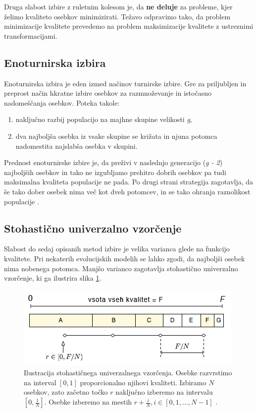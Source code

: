 \documentclass[a4paper, 12pt]{book}
\begin{document}
Druga slabost izbire z ruletnim kolesom je, da \textbf{ne deluje} za probleme, kjer \v zelimo kvaliteto osebkov minimizirati. Te\v zavo odpravimo tako, da problem minimizacije kvalitete prevedemo na problem maksimizacije kvalitete z ustreznimi transformacijami.

\subsection{Enoturnirska izbira}
Enoturnirska izbira je eden izmed na\v cinov turnirske izbire. Gre za priljubljen in preprost na\v cin hkratne izbire osebkov za razmno\v zevanje in isto\v casno nadome\v s\v canja osebkov. Poteka takole:
\begin{enumerate}
\item naklju\v cno razbij populacijo na majhne skupine velikosti \textit{g},
\item dva najbolj\v sa osebka iz vsake skupine se kri\v zata in njuna potomca nadomestita najslab\v sa osebka v skupini.
\end{enumerate}

Prednost enoturnirske izbire je, da pre\v zivi v naslednjo generacijo (\textit{g - 2}) najbolj\v sih osebkov in tako ne izgubljamo prehitro dobrih osebkov pa tudi maksimalna kvaliteta populacije ne pada. Po drugi strani strategija zagotavlja, da \v se tako dober osebek nima ve\v c kot dveh potomcev, in se tako ohranja raznolikost populacije
\cite{inteligentni sistemi}.

\subsection{Stohasti\v cno univerzalno vzor\v cenje}
Slabost do sedaj opisanih metod izbire je velika varianca glede na funkcijo kvalitete. Pri nekaterih evolucijskih modelih se lahko zgodi, da najbolj\v si osebek nima nobenega potomca. Manj\v so varianco zagotavlja stohasti\v cno univerzalno vzor\v cenje, ki ga ilustrira slika \ref{fig:stohasticno univerzalno vzorcenje}.

\begin{figure}
\begin{center}
\includegraphics[scale=0.70]{stohasticno_univerzalno_vzorcenje.png}
\end{center}
\caption{Ilustracija stohasti\v cnega univerzalnega vzor\v cenja. Osebke razvrstimo na interval $[0, 1]$ proporcionalno njihovi kvaliteti. Izbiramo $N$ osebkov, zato za\v cetno to\v cko $r$ naklju\v cno izberemo na intervalu $[0, \frac{1}{N}]$. Osebke izberemo na mestih $r + \frac{i}{N}, i \in [0, 1, \dots, N-1]$ \cite{inteligentni sistemi}.}
\label{fig:stohasticno univerzalno vzorcenje}
\end{figure}
\end{document}
